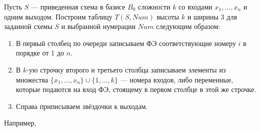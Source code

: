 Пусть $S$ --- приведенная схема в базисе $B_0$ сложности $k$ со входами $x_1, \ldots, x_n$ и одним выходом. Построим таблицу $T(S, Num)$ высоты $k$ и ширины 3 для заданной схемы $S$ и выбранной нумерации $Num$ следующим образом:
\begin{enumerate}[nolistsep]
    \item В первый столбец по очереди записываем ФЭ соответствующие номеру $i$ в порядке от 1 до $n$.
    \item В $k$-ую строчку второго и третьего столбца записываем элементы из множества $\{x_1, \ldots, x_n\} \cup \{1, \ldots, k\}$ --- номера входов, либо переменные, которые подаются на вход ФЭ, стоящему в первом столбце в этой же строчке.
    \item Справа приписываем звёздочки к выходам.
\end{enumerate}
Например,
